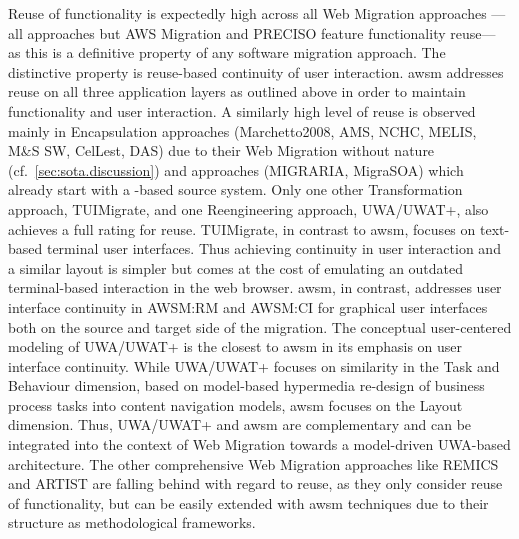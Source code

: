 Reuse of functionality is expectedly high across all \gls{Web Migration} approaches --- all approaches but AWS Migration and PRECISO feature functionality reuse--- as this is a definitive property of any software migration approach.
The distinctive property is reuse-based continuity of user interaction.
\gls{awsm} addresses reuse on all three application layers as outlined above in order to maintain functionality and user interaction.
A similarly high level of reuse is observed mainly in \gls{Encapsulation} approaches (Marchetto2008, AMS, NCHC, MELIS, M\&S SW, CelLest, DAS) due to their \gls{Web Migration} without  nature (cf.~\cref{sec:sota.discussion}) and  approaches (MIGRARIA, MigraSOA) which already start with a -based \gls{source system}.
Only one other \gls{Transformation} approach, TUIMigrate, and one \gls{Reengineering} approach, UWA/UWAT+, also achieves a full rating for reuse.
TUIMigrate, in contrast to \gls{awsm}, focuses on text-based terminal user interfaces.
Thus achieving continuity in user interaction and a similar layout is simpler but comes at the cost of emulating an outdated terminal-based interaction in the \gls{web} browser.
\gls{awsm}, in contrast, addresses user interface continuity in AWSM:RM and AWSM:CI for graphical user interfaces both on the source and target side of the migration.
The conceptual user-centered modeling of UWA/UWAT+ is the closest to \gls{awsm} in its emphasis on user interface continuity.
While UWA/UWAT+ focuses on similarity in the Task and Behaviour dimension, based on model-based hypermedia re-design of business process tasks into content navigation models, \gls{awsm} focuses on the Layout dimension.
Thus, UWA/UWAT+ and \gls{awsm} are complementary and can be integrated into the context of \gls{Web Migration} towards a model-driven UWA-based architecture.
The other comprehensive \gls{Web Migration} approaches like REMICS and ARTIST are falling behind with regard to reuse, as they only consider reuse of functionality, but can be easily extended with \gls{awsm} techniques due to their structure as methodological frameworks.

